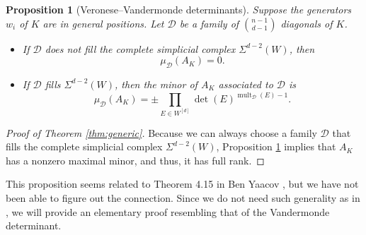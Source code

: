 \documentclass{article}
\newtheorem{prop}[thm]{Proposition}
\DeclareMathOperator{\mult}{mult}
\begin{document}
\begin{prop}[Veronese--Vandermonde determinants] \label{prop:VerVan}
	Suppose the generators $w_i$ of $K$ are in general positions. Let $\mathcal{D}$ be a family of $\binom{n-1}{d-1}$ diagonals of $K$. 
    \begin{itemize}
    \item[(i)] If $\mathcal{D}$ does not fill the complete simplicial complex  $\Sigma^{d-2}(W)$, then
    \begin{equation} \label{eq:VerVan1}
    	\mu_\mathcal{D} (A_K) = 0.
    \end{equation}
    \item[(ii)] If $\mathcal{D}$ fills $\Sigma^{d-2}(W)$, then the minor of $A_K$ associated to $\mathcal{D}$ is
    \begin{equation} \label{eq:VerVan2}
    	\mu_\mathcal{D} (A_K) = \pm \prod_{E \in W^{[d]}} \det(E)^{\mult_\mathcal{D} (E) - 1}.
    \end{equation}
    \end{itemize} 
\end{prop}

\begin{proof}[Proof of Theorem \ref{thm:generic}]
	Because we can always choose a family $\mathcal{D}$ that fills the complete simplicial complex  $\Sigma^{d-2}(W)$, Proposition \ref{prop:VerVan} implies that $A_K$ has a nonzero maximal minor, and thus, it has full rank.
\end{proof}

This proposition seems related to Theorem 4.15 in Ben Yaacov \cite{yaacov2014multivariate}, but we have not been able to figure out the connection. Since we do not need such generality as in \cite{yaacov2014multivariate}, we will provide an elementary proof resembling that of the Vandermonde determinant.
\end{document}
